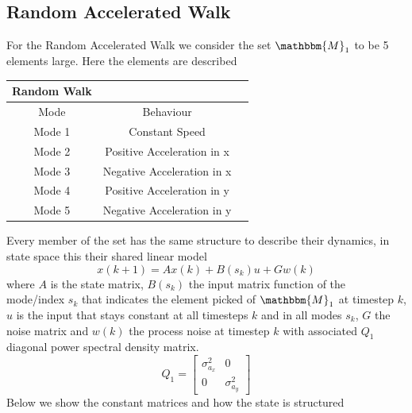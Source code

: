 \documentclass[twocolumn]{article}
\begin{document}
\subsection*{Random Accelerated Walk}
For the Random Accelerated Walk we consider the set $\mathbbm{M}_{1}$ to be 5 elements large.
Here the elements are described
\begin{center}
    \begin{tabular}{||c||c |c |}%
        \hline
        Random Walk                         \\
        \hline\hline
        Mode   & Behaviour                  \\ [0.5ex]
        \hline\hline
        Mode 1 & Constant Speed             \\
        \hline
        Mode 2 & Positive Acceleration in x \\
        \hline
        Mode 3 & Negative Acceleration in x \\
        \hline
        Mode 4 & Positive Acceleration in y \\
        \hline
        Mode 5 & Negative Acceleration in y \\ [1ex]
        \hline
    \end{tabular}
\end{center}
Every member of the set has the same structure
to describe their dynamics, in state space this their shared linear model
\begin{equation*}
    x(k+1)= Ax(k) + B(s_{k})u + Gw(k)
\end{equation*}
where $A$ is the state matrix, $B(s_{k})$ the input matrix function of the mode/index $s_{k}$ that indicates the element picked of $\mathbbm{M}_{1}$ at timestep $k$,
$u$ is the input that stays constant at all timesteps $k$ and in all modes $s_{k}$, $G$ the noise matrix and $w(k)$ the process noise at timestep
$k$ with associated $Q_{1}$ diagonal power spectral density matrix.
\begin{equation*}
    Q_{1}=\begin{bmatrix}
        \sigma^{2}_{a_{x}} & 0                  \\
        0                  & \sigma^{2}_{a_{y}}
    \end{bmatrix}
\end{equation*}
Below we show the constant matrices and how the state is structured
\end{document}
